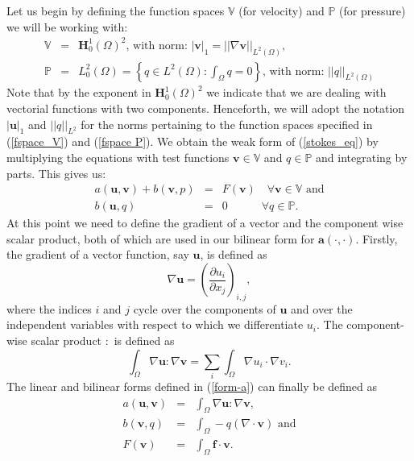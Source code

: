 \documentclass[12pt,a4paper]{article}
\theoremstyle{definition}
\begin{document}
Let us begin by defining the  function spaces $\mathbb{V}$ (for velocity) and $\mathbb{P}$ (for pressure) we will be working with:
\begin{eqnarray}\label{fspace_V}
\mathbb{V}&=&\textbf{H}^1_0\left(\Omega\right)^2\text{, with norm: } \left|\textbf{v}\right|_{1}=\left|\left|\nabla\textbf{v}\right|\right|_{L^2\left(\Omega\right)}, \\\label{fspace P}
\mathbb{P}&=&L^2_0\left(\Omega\right)=\left\lbrace q\in L^2\left(\Omega\right): \int_\Omega q=0\right\rbrace\text{, with norm: } \left|\left|q\right|\right|_{L^2\left(\Omega\right)}
\end{eqnarray}
Note that by the exponent in $\textbf{H}^{1}_{0}\left(\Omega\right)^2$ we indicate that we are dealing with vectorial functions with two components. Henceforth, we will adopt the notation $\left|\textbf{u}\right|_1$ and $\left|\left|q\right|\right|_{L^2}$ for the norms pertaining to the function spaces specified in (\ref{fspace_V}) and (\ref{fspace P}).  
We obtain the weak form of (\ref{stokes_eq}) by multiplying the equations with test functions $\textbf{v}\in \mathbb{V}$ and $q\in\mathbb{P}$ and integrating by parts.  This gives us:
\begin{eqnarray}\label{form-a}
a\left(\textbf{u},\textbf{v}\right) + b\left(\textbf{v},p\right) &=& F\left(\textbf{v}\right)\quad \forall 
\textbf{v} \in \mathbb{V} \text{ and} \\ \label{form-b}
b\left(\textbf{u},q\right)&=&0 \quad \quad\quad\forall q \in \mathbb{P}.
\end{eqnarray}
At this point we need to define the gradient of a vector and the component wise scalar product, both of which are used in our bilinear form for $\textbf{a}\left(\cdot, \cdot\right)$.
Firstly, the gradient of a vector function, say $\textbf{u}$, is defined as
\begin{equation}
\nabla \textbf{u} = \left(\frac{\partial u_i}{\partial x_j}\right)_{i,j},
\end{equation}
where the indices $i$ and $j$ cycle over the components of $\textbf{u}$ and over the independent variables with respect to which we differentiate $u_i$. The component-wise scalar product $:$ is defined as
\begin{equation}
\int_{\Omega}\nabla \textbf{u} : \nabla \textbf{v}=	\sum_{i}\int_{\Omega}\nabla u_i \cdot \nabla v_i.\nonumber
\end{equation}
The linear and bilinear forms defined in (\ref{form-a}) can finally be defined as 
\begin{eqnarray}\label{weak-a}
	a\left(\textbf{u},\textbf{v}\right)&=&\int_{\Omega}\nabla \textbf{u} : \nabla \textbf{v}, \\\label{weak-b}
	b\left(\textbf{v},q\right) &=& \int_{\Omega}-q\left(\nabla \cdot \textbf{v}\right) \text{ and}\\\label{weak-F}
    F\left(\textbf{v}\right) &=& \int_{\Omega}\textbf{f}\cdot \textbf{v} .
\end{eqnarray}
\end{document}
